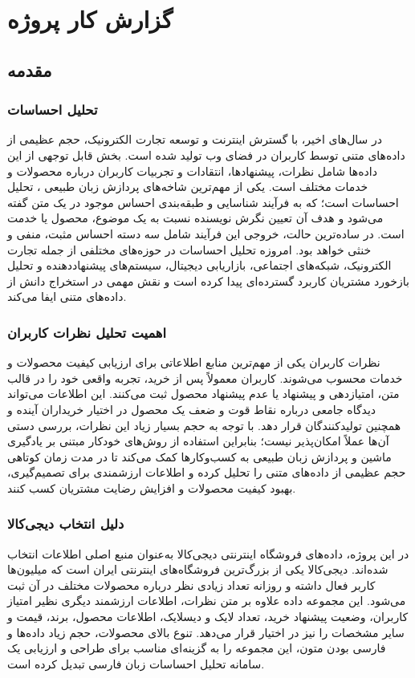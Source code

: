 \chapter*{گزارش کار پروژه}

\section{مقدمه}
\subsection{تحلیل احساسات }
در سال‌های اخیر، با گسترش اینترنت و توسعه تجارت الکترونیک، حجم عظیمی از داده‌های متنی توسط کاربران در فضای وب تولید شده است. بخش قابل توجهی از این داده‌ها شامل نظرات، پیشنهادها، انتقادات و تجربیات کاربران درباره محصولات و خدمات مختلف است. یکی از مهم‌ترین شاخه‌های پردازش زبان طبیعی ، تحلیل احساسات است؛ که به فرآیند شناسایی و طبقه‌بندی احساس موجود در یک متن گفته می‌شود و هدف آن تعیین نگرش نویسنده نسبت به یک موضوع، محصول یا خدمت است. در ساده‌ترین حالت، خروجی این فرآیند شامل سه دسته احساس مثبت، منفی و خنثی خواهد بود. امروزه تحلیل احساسات در حوزه‌های مختلفی از جمله تجارت الکترونیک، شبکه‌های اجتماعی، بازاریابی دیجیتال، سیستم‌های پیشنهاددهنده و تحلیل بازخورد مشتریان کاربرد گسترده‌ای پیدا کرده است و نقش مهمی در استخراج دانش از داده‌های متنی ایفا می‌کند.

\subsection{اهمیت تحلیل نظرات کاربران}
نظرات کاربران یکی از مهم‌ترین منابع اطلاعاتی برای ارزیابی کیفیت محصولات و خدمات محسوب می‌شوند. کاربران معمولاً پس از خرید، تجربه واقعی خود را در قالب متن، امتیازدهی و پیشنهاد یا عدم پیشنهاد محصول ثبت می‌کنند. این اطلاعات می‌تواند دیدگاه جامعی درباره نقاط قوت و ضعف یک محصول در اختیار خریداران آینده و همچنین تولیدکنندگان قرار دهد. با توجه به حجم بسیار زیاد این نظرات، بررسی دستی آن‌ها عملاً امکان‌پذیر نیست؛ بنابراین استفاده از روش‌های خودکار مبتنی بر یادگیری ماشین و پردازش زبان طبیعی به کسب‌وکارها کمک می‌کند تا در مدت زمان کوتاهی حجم عظیمی از داده‌های متنی را تحلیل کرده و اطلاعات ارزشمندی برای تصمیم‌گیری، بهبود کیفیت محصولات و افزایش رضایت مشتریان کسب کنند.

\subsection{دلیل انتخاب دیجی‌کالا}
در این پروژه، داده‌های فروشگاه اینترنتی دیجی‌کالا به‌عنوان منبع اصلی اطلاعات انتخاب شده‌اند. دیجی‌کالا یکی از بزرگ‌ترین فروشگاه‌های اینترنتی ایران است که میلیون‌ها کاربر فعال داشته و روزانه تعداد زیادی نظر درباره محصولات مختلف در آن ثبت می‌شود. این مجموعه داده علاوه بر متن نظرات، اطلاعات ارزشمند دیگری نظیر امتیاز کاربران، وضعیت پیشنهاد خرید، تعداد لایک و دیسلایک، اطلاعات محصول، برند، قیمت و سایر مشخصات را نیز در اختیار قرار می‌دهد. تنوع بالای محصولات، حجم زیاد داده‌ها و فارسی بودن متون، این مجموعه را به گزینه‌ای مناسب برای طراحی و ارزیابی یک سامانه تحلیل احساسات زبان فارسی تبدیل کرده است.
